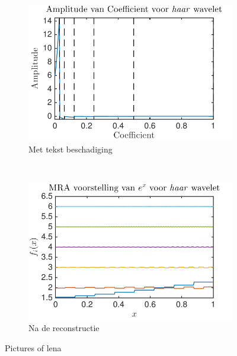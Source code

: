 \begin{figure}
\begin{subfigure}[b]{0.45\textwidth}
        \includegraphics[width=\textwidth]{../src/denoising/haar_noNoise/coef_exp_haar_5}
        \caption{Met tekst beschadiging}
        \label{fig:tiger}
    \end{subfigure}
    ~ %
    \begin{subfigure}[b]{0.45\textwidth}
        \includegraphics[width=\textwidth]{../src/denoising/haar_noNoise/MRA_exp_haar_5}
        \caption{Na de reconstructie}
        \label{fig:mouse}
    \end{subfigure}

    \caption{Pictures of lena}\label{fig:animals}
\end{figure}

